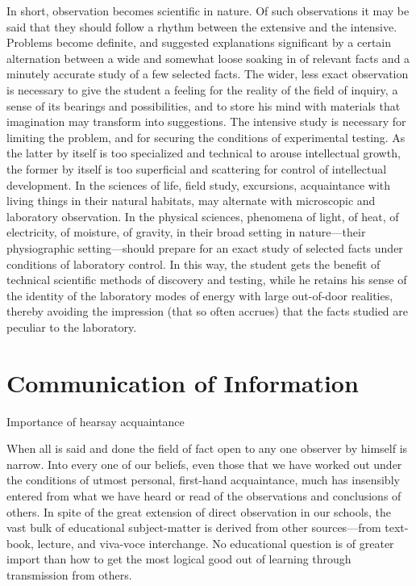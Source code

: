 \documentclass[letterpaper]{book}
\begin{document}
In short, observation becomes scientific in nature. Of such observations
it may be said that they should follow a rhythm between the extensive
and the intensive. Problems become definite, and suggested explanations
significant by a certain alternation between a wide and somewhat loose
soaking in of relevant facts and a minutely accurate study of a few
selected facts. The wider, less exact observation is necessary to give
the student a feeling for the reality of the field of inquiry, a sense
of its bearings and possibilities, and to store his mind with materials
that imagination may transform into suggestions. The intensive study is
necessary for limiting the problem, and for securing the conditions of
experimental testing. As the latter by itself is too specialized and
technical to arouse intellectual growth, the former by itself is too
superficial and scattering for control of intellectual development. In
the sciences of life, field study, excursions, acquaintance with living
things in their natural habitats, may alternate with microscopic and
laboratory observation. In the physical sciences, phenomena of light, of
heat, of electricity, of moisture, of gravity, in their broad setting in
nature---their physiographic setting---should prepare for an exact study
of selected facts under conditions of
laboratory
control. In this way, the student gets the benefit of technical
scientific methods of discovery and testing, while he retains his sense
of the identity of the laboratory modes of energy with large out-of-door
realities, thereby avoiding the impression (that so often accrues) that
the facts studied are peculiar to the laboratory.

\section{Communication of Information}

Importance of hearsay acquaintance

When all is said and done the field of fact open to any one observer by
himself is narrow. Into every one of our beliefs, even those that we
have worked out under the conditions of utmost personal, first-hand
acquaintance, much has insensibly entered from what we have heard or
read of the observations and conclusions of others. In spite of the
great extension of direct observation in our schools, the vast bulk of
educational subject-matter is derived from other sources---from
text-book, lecture, and viva-voce interchange. No educational question
is of greater import than how to get the most logical good out of
learning through transmission from others.
\end{document}
